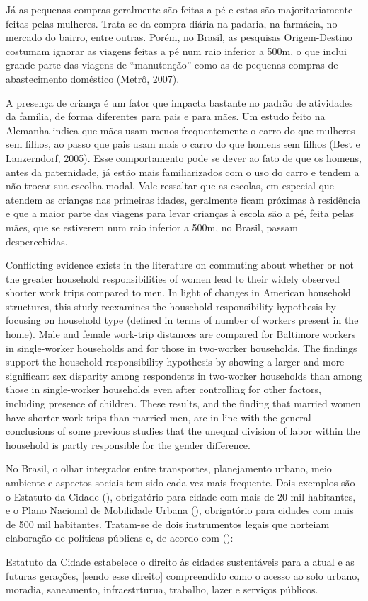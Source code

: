 Já as pequenas compras geralmente são feitas a pé e estas são majoritariamente feitas pelas mulheres. Trata-se da compra diária na padaria, na farmácia, no mercado do bairro, entre outras. Porém, no Brasil, as pesquisas Origem-Destino costumam ignorar as viagens feitas a pé num raio inferior a 500m, o que inclui grande parte das viagens de “manutenção” como as de pequenas compras de abastecimento doméstico (Metrô, 2007).

A presença de criança é um fator que impacta bastante no padrão de atividades da família, de forma diferentes para pais e para mães. Um estudo feito na Alemanha indica que mães usam menos frequentemente o carro do que mulheres sem filhos, ao passo que pais usam mais o carro do que homens sem filhos (Best e Lanzerndorf, 2005). Esse comportamento pode se dever ao fato de que os homens, antes da paternidade, já estão mais familiarizados com o uso do carro e tendem a não trocar sua escolha modal. Vale ressaltar que as escolas, em especial que atendem as crianças nas primeiras idades, geralmente ficam próximas à residência e que a maior parte das viagens para levar crianças à escola são a pé, feita pelas mães, que se estiverem num raio inferior a 500m, no Brasil, passam despercebidas.

Conflicting evidence exists in the literature on commuting about whether or not the greater household responsibilities of women lead to their widely observed shorter work trips compared to men. In light of changes in American household structures, this study reexamines the household responsibility hypothesis by focusing on household type (defined in terms of number of workers present in the home). Male and female work-trip distances are compared for Baltimore workers in single-worker households and for those in two-worker households. The findings support the household responsibility hypothesis by showing a larger and more significant sex disparity among respondents in two-worker households than among those in single-worker households even after controlling for other factors, including presence of children. These results, and the finding that married women have shorter work trips than married men, are in line with the general conclusions of some previous studies that the unequal division of labor within the household is partly responsible for the gender difference. \cite{IBIPO1992}


No Brasil, o olhar integrador entre transportes, planejamento urbano, meio ambiente e aspectos sociais tem sido cada vez mais frequente. Dois exemplos são o Estatuto da Cidade (\citeyear{ESTCIDADE2001}), obrigatório para cidade com mais de 20 mil habitantes, e o Plano Nacional de Mobilidade Urbana (\citeyear{ESTCIDADE2001}), obrigatório para cidades com mais de 500 mil habitantes. Tratam-se de dois instrumentos legais que norteiam elaboração de políticas públicas e, de acordo com (\citeyear{IEMA2010}):

\begin{citacao}
Estatuto da Cidade estabelece o direito às cidades sustentáveis para a atual e as futuras gerações, [sendo esse direito] compreendido como o acesso ao solo urbano, moradia, saneamento, infraestrturua, trabalho, lazer e serviços públicos.
\end{citacao}


